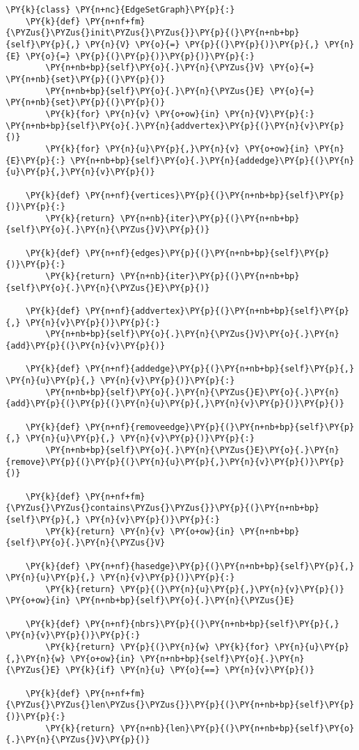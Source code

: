 \begin{Verbatim}[commandchars=\\\{\}]
\PY{k}{class} \PY{n+nc}{EdgeSetGraph}\PY{p}{:}
    \PY{k}{def} \PY{n+nf+fm}{\PYZus{}\PYZus{}init\PYZus{}\PYZus{}}\PY{p}{(}\PY{n+nb+bp}{self}\PY{p}{,} \PY{n}{V} \PY{o}{=} \PY{p}{(}\PY{p}{)}\PY{p}{,} \PY{n}{E} \PY{o}{=} \PY{p}{(}\PY{p}{)}\PY{p}{)}\PY{p}{:}
        \PY{n+nb+bp}{self}\PY{o}{.}\PY{n}{\PYZus{}V} \PY{o}{=} \PY{n+nb}{set}\PY{p}{(}\PY{p}{)}
        \PY{n+nb+bp}{self}\PY{o}{.}\PY{n}{\PYZus{}E} \PY{o}{=} \PY{n+nb}{set}\PY{p}{(}\PY{p}{)}
        \PY{k}{for} \PY{n}{v} \PY{o+ow}{in} \PY{n}{V}\PY{p}{:} \PY{n+nb+bp}{self}\PY{o}{.}\PY{n}{addvertex}\PY{p}{(}\PY{n}{v}\PY{p}{)}
        \PY{k}{for} \PY{n}{u}\PY{p}{,}\PY{n}{v} \PY{o+ow}{in} \PY{n}{E}\PY{p}{:} \PY{n+nb+bp}{self}\PY{o}{.}\PY{n}{addedge}\PY{p}{(}\PY{n}{u}\PY{p}{,}\PY{n}{v}\PY{p}{)}

    \PY{k}{def} \PY{n+nf}{vertices}\PY{p}{(}\PY{n+nb+bp}{self}\PY{p}{)}\PY{p}{:}
        \PY{k}{return} \PY{n+nb}{iter}\PY{p}{(}\PY{n+nb+bp}{self}\PY{o}{.}\PY{n}{\PYZus{}V}\PY{p}{)}

    \PY{k}{def} \PY{n+nf}{edges}\PY{p}{(}\PY{n+nb+bp}{self}\PY{p}{)}\PY{p}{:}
        \PY{k}{return} \PY{n+nb}{iter}\PY{p}{(}\PY{n+nb+bp}{self}\PY{o}{.}\PY{n}{\PYZus{}E}\PY{p}{)}

    \PY{k}{def} \PY{n+nf}{addvertex}\PY{p}{(}\PY{n+nb+bp}{self}\PY{p}{,} \PY{n}{v}\PY{p}{)}\PY{p}{:}
        \PY{n+nb+bp}{self}\PY{o}{.}\PY{n}{\PYZus{}V}\PY{o}{.}\PY{n}{add}\PY{p}{(}\PY{n}{v}\PY{p}{)}

    \PY{k}{def} \PY{n+nf}{addedge}\PY{p}{(}\PY{n+nb+bp}{self}\PY{p}{,} \PY{n}{u}\PY{p}{,} \PY{n}{v}\PY{p}{)}\PY{p}{:}
        \PY{n+nb+bp}{self}\PY{o}{.}\PY{n}{\PYZus{}E}\PY{o}{.}\PY{n}{add}\PY{p}{(}\PY{p}{(}\PY{n}{u}\PY{p}{,}\PY{n}{v}\PY{p}{)}\PY{p}{)}

    \PY{k}{def} \PY{n+nf}{removeedge}\PY{p}{(}\PY{n+nb+bp}{self}\PY{p}{,} \PY{n}{u}\PY{p}{,} \PY{n}{v}\PY{p}{)}\PY{p}{:}
        \PY{n+nb+bp}{self}\PY{o}{.}\PY{n}{\PYZus{}E}\PY{o}{.}\PY{n}{remove}\PY{p}{(}\PY{p}{(}\PY{n}{u}\PY{p}{,}\PY{n}{v}\PY{p}{)}\PY{p}{)}

    \PY{k}{def} \PY{n+nf+fm}{\PYZus{}\PYZus{}contains\PYZus{}\PYZus{}}\PY{p}{(}\PY{n+nb+bp}{self}\PY{p}{,} \PY{n}{v}\PY{p}{)}\PY{p}{:}
        \PY{k}{return} \PY{n}{v} \PY{o+ow}{in} \PY{n+nb+bp}{self}\PY{o}{.}\PY{n}{\PYZus{}V}

    \PY{k}{def} \PY{n+nf}{hasedge}\PY{p}{(}\PY{n+nb+bp}{self}\PY{p}{,} \PY{n}{u}\PY{p}{,} \PY{n}{v}\PY{p}{)}\PY{p}{:}
        \PY{k}{return} \PY{p}{(}\PY{n}{u}\PY{p}{,}\PY{n}{v}\PY{p}{)} \PY{o+ow}{in} \PY{n+nb+bp}{self}\PY{o}{.}\PY{n}{\PYZus{}E}

    \PY{k}{def} \PY{n+nf}{nbrs}\PY{p}{(}\PY{n+nb+bp}{self}\PY{p}{,} \PY{n}{v}\PY{p}{)}\PY{p}{:}
        \PY{k}{return} \PY{p}{(}\PY{n}{w} \PY{k}{for} \PY{n}{u}\PY{p}{,}\PY{n}{w} \PY{o+ow}{in} \PY{n+nb+bp}{self}\PY{o}{.}\PY{n}{\PYZus{}E} \PY{k}{if} \PY{n}{u} \PY{o}{==} \PY{n}{v}\PY{p}{)}

    \PY{k}{def} \PY{n+nf+fm}{\PYZus{}\PYZus{}len\PYZus{}\PYZus{}}\PY{p}{(}\PY{n+nb+bp}{self}\PY{p}{)}\PY{p}{:}
        \PY{k}{return} \PY{n+nb}{len}\PY{p}{(}\PY{n+nb+bp}{self}\PY{o}{.}\PY{n}{\PYZus{}V}\PY{p}{)}
\end{Verbatim}
